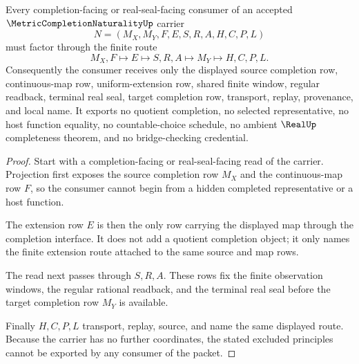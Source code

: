 \begin{theorem}
\label{thm:metric-completion-naturality-consumer-nonescape}
Every completion-facing or real-seal-facing consumer of an accepted $\MetricCompletionNaturalityUp$ carrier
$$
N=(M_X,M_Y,F,E,S,R,A,H,C,P,L)
$$
must factor through the finite route
$$
M_X,F \longmapsto E \longmapsto S,R,A \longmapsto M_Y \longmapsto H,C,P,L .
$$
Consequently the consumer receives only the displayed source completion row, continuous-map row, uniform-extension row, shared finite window, regular readback, terminal real seal, target completion row, transport, replay, provenance, and local name. It exports no quotient completion, no selected representative, no host function equality, no countable-choice schedule, no ambient $\RealUp$ completeness theorem, and no bridge-checking credential.
\end{theorem}
\begin{proof}
Start with a completion-facing or real-seal-facing read of the carrier. Projection first exposes the source completion row $M_X$ and the continuous-map row $F$, so the consumer cannot begin from a hidden completed representative or a host function.

The extension row $E$ is then the only row carrying the displayed map through the completion interface. It does not add a quotient completion object; it only names the finite extension route attached to the same source and map rows.

The read next passes through $S,R,A$. These rows fix the finite observation windows, the regular rational readback, and the terminal real seal before the target completion row $M_Y$ is available.

Finally $H,C,P,L$ transport, replay, source, and name the same displayed route. Because the carrier has no further coordinates, the stated excluded principles cannot be exported by any consumer of the packet.
\end{proof}


